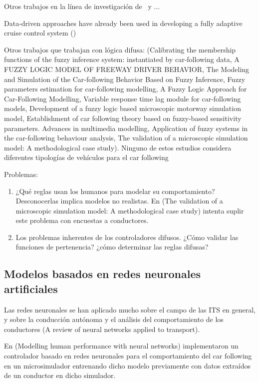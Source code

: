 Otros trabajos en la línea de investigación de~\cite{Kikuchi1992} y \cite{Chakroborty1999}
...

Data-driven approaches have already been used in developing a fully adaptive cruise control system (\cite{Simonelli2009, Bifulco2014})

Otros trabajos que trabajan con lógica difusa: (Calibrating the membership functions of the fuzzy inference system: instantiated by car-following data, A FUZZY LOGIC MODEL OF FREEWAY DRIVER BEHAVIOR, The Modeling and Simulation of the Car-following Behavior Based on Fuzzy Inference, Fuzzy parameters estimation for car-following modelling, A Fuzzy Logic Approach for Car-Following Modelling, Variable response time lag module for car-following models, Development of a fuzzy logic based microscopic motorway simulation model, Establishment of car following theory based on fuzzy-based sensitivity parameters. Advances in multimedia modelling, Application of fuzzy systems in the car-following behaviour analysis, The validation of a microscopic simulation model: A methodological case study). Ninguno de estos estudios considera diferentes tipologías de vehículos para el car following

Problemas:

\begin{enumerate}
	\item ¿Qué reglas usan los humanos para modelar su comportamiento? Desconocerlas implica modelos no realistas. En (The validation of a microscopic simulation model: A methodological case study) intenta suplir este problema con encuestas a conductores.
	\item Los problemas inherentes de los controladores difusos. ¿Cómo validar las funciones de pertenencia? ¿cómo determinar las reglas difusas?
\end{enumerate}

\subsection{Modelos basados en redes neuronales artificiales}

Las redes neuronales se han aplicado mucho sobre el campo de las ITS en general, y sobre la conducción autónoma y el análisis del comportamiento de los conductores (A review of neural networks applied to transport).

En (Modelling human performance with neural networks) implementaron un controlador basado en redes neuronales para el comportamiento del car following en un microsimulador entrenando dicho modelo previamente con datos extraídos de un conductor en dicho simulador.

